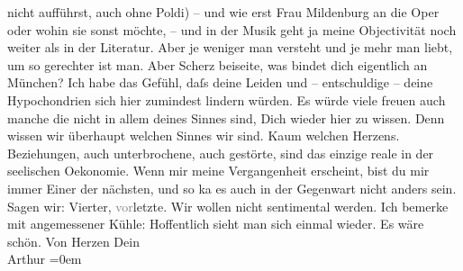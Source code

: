 \begin{ledgroupsized}[t]{13cm}
               nicht aufführst, auch ohne Poldi) – und wie erst
               Frau Mildenburg an die Oper oder wohin sie sonst möchte, – und in der Musik geht ja meine
               Objectivität noch weiter als in der Literatur. Aber je weniger man versteht und je
               mehr man liebt, um so gerechter ist man.\pend
           \pstart
           Aber Scherz beiseite, was bindet dich eigentlich an München? Ich habe das Gefühl, daſs deine Leiden und – entschuldige – deine
               Hypochondrien sich hier zumindest lindern würden. Es würde viele freuen auch manche
               die nicht in allem deines Sinnes sind, Dich wieder hier zu wissen. Denn wissen wir
               überhaupt {\pb}welchen
               Sinnes wir sind. Kaum welchen Herzens. Beziehungen, auch unterbrochene, auch
               gestörte, sind das einzige reale in der seelischen Oekonomie. \label{LL141-1v}\label{LL141-1h}Wenn mir meine Vergangenheit erscheint, bist du mir immer Einer
               der nächsten, und so ka{\geminationn} es auch in der Gegenwart nicht
               anders sein. \pend
           \pstart
           \label{K_L02533_2v}\label{K_L02533_2h} Sagen wir: Vierter,
                  \textcolor{gray}{vor}letzte. Wir wollen nicht sentimental \introOben{}werden.\introOben{} Ich bemerke mit angemessener Kühle: Hoffentlich sieht man sich
               einmal wieder. Es wäre schön.\pend
           \pstart
           Von Herzen Dein{\\[\baselineskip]}\spacefill\mbox{Arthur}\pend
           \leftskip=0em{}\endnumbering{}\end{ledgroupsized}  \newcommand{\dateiname}{L02533}\newcommand{\titel}{Arthur Schnitzler an Hermann Bahr, 17. 3. 1930}\newcommand{\editorInnen}{ Kurt Ifkovits,  Martin Anton Müller}
      
